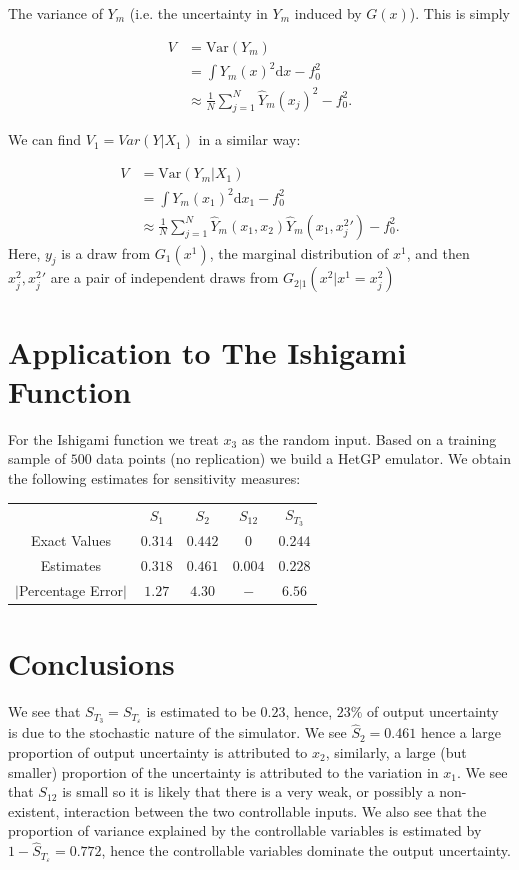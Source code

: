 \documentclass[12pt]{article}
\newcommand{\var}{\text{Var}}
\newcommand{\dd}{\text{d}}
\begin{document}
The variance of $Y_m$ (i.e. the uncertainty in $Y_m$ induced by $G(x)$). This is simply

\begin{align}
	V & = \var(Y_m) \\
	  & = \int Y_m(x)^2 \dd x - f_0^2 \\
	  & \approx \frac{1}{N} \sum_{j = 1}^N \hat{Y}_m(x_j)^2 - f_0^2.
\end{align}

We can find $V_1 = Var(Y | X_1)$ in a similar way:

\begin{align}
	V & = \var(Y_m|X_1) \\
	  & = \int Y_m(x_1)^2 \dd x_1 - f_0^2 \\
	  & \approx \frac{1}{N} \sum_{j = 1}^N \hat{Y}_m(x_1, x_2)\hat{Y}_m(x_1, {x^{2}_j}' ) - f_0^2.
\end{align}
Here, $y_j$ is a draw from $G_1(x^1)$, the marginal distribution of $x^1$, and then $x^2_j, {x^{2}_j}'$ are a pair of independent draws from $G_{2|1}(x^2| x^1 = x^2_j)$

\section{Application to The Ishigami Function}

For the Ishigami function we treat $x_3$ as the random input. Based on a training sample of $500$ data points (no replication) we build a HetGP emulator. We obtain the following estimates for sensitivity measures:

\begin{table}[h]
	\centering
	\begin{tabular}{ccccc}
	\toprule
	& $S_1$ & $S_2$ & $S_{12}$ & $S_{T_3}$ \\ \cmidrule{1-5}
	Exact Values& $0.314$ & $0.442$ & $0$ & $0.244$ \\
	Estimates& $0.318$ & $0.461$ & $0.004$ & $0.228$\\
	$|$Percentage Error$|$& $1.27$ & $4.30$ & $-$ & $6.56$ \\\bottomrule
	\end{tabular}
\end{table}
\section{Conclusions}

We see that $S_{T_3} = S_{T_\varepsilon}$ is estimated to be $0.23$, hence, $23\%$  of output uncertainty is due to the stochastic nature of the simulator. We see $\hat{S}_2 = 0.461$ hence a large proportion of output uncertainty is attributed to $x_2$, similarly, a large (but smaller) proportion of the uncertainty is attributed to the variation in $x_1$. We see that $S_{12}$ is small so it is likely that there is a very weak, or possibly a non-existent, interaction between the two controllable inputs. We also see that the proportion of variance explained by the controllable variables is estimated by $1 - \hat{S}_{T_\varepsilon} = 0.772$, hence the controllable variables dominate the output uncertainty.
\end{document}
